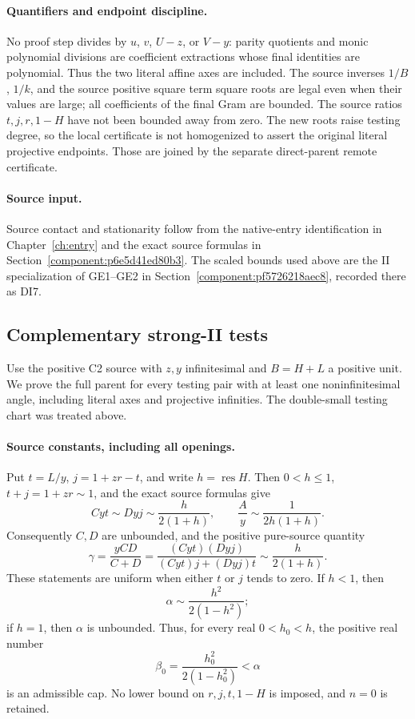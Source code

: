 \paragraph{Quantifiers and endpoint discipline.}
No proof step divides by $u$, $v$, $U-z$, or $V-y$: parity quotients
and monic polynomial divisions are coefficient extractions whose
final identities are polynomial.  Thus the two literal affine axes
are included.  The source inverses $1/B$, $1/k$, and the source
positive square term square roots are legal even when their values are large;
all coefficients of the final Gram are bounded.  The source ratios
$t,j,r,1-H$ have not been bounded away from zero.  The new roots
raise testing degree, so the local certificate is not homogenized
to assert the original literal projective endpoints.  Those are
joined by the separate direct-parent remote certificate.

\paragraph{Source input.}
Source contact and stationarity follow from the native-entry identification in Chapter~\ref{ch:entry} and the exact source formulas in Section~\ref{component:p6e5d41ed80b3}. The scaled bounds used above are the II specialization of GE1--GE2 in Section~\ref{component:pf5726218aec8}, recorded there as DI7.

\subsection{Complementary strong-II tests}
\label{component:p590112f102bd}

\label{p590112f102bd:sec:r7-c2-remote}

Use the positive C2 source with $z,y$ infinitesimal and $B=H+L$ a
positive unit. We prove the full parent for every testing pair with at
least one noninfinitesimal angle, including literal axes and projective
infinities. The double-small testing chart was treated above.

\paragraph{Source constants, including all openings.}
Put $t=L/y$, $j=1+zr-t$, and write $h=\operatorname{res}H$.
Then $0<h\leq1$, $t+j=1+zr\sim1$, and the exact source formulas give
\[
 Cyt\sim Dyj\sim\frac{h}{2(1+h)},\qquad
 \frac Ay\sim\frac1{2h(1+h)}.
\]
Consequently $C,D$ are unbounded, and the positive pure-source quantity
\[
 \gamma=\frac{yCD}{C+D}
 =\frac{(Cyt)(Dyj)}{(Cyt)j+(Dyj)t}
 \sim\frac{h}{2(1+h)}.                                      \tag{RR1}
\]
These statements are uniform when either $t$ or $j$ tends to zero.
If $h<1$, then
\[
 \alpha\sim\frac{h^2}{2(1-h^2)};
\]
if $h=1$, then $\alpha$ is unbounded.  Thus, for every real
$0<h_0<h$, the positive real number
\[
 \beta_0=\frac{h_0^2}{2(1-h_0^2)}<\alpha                     \tag{RR2}
\]
is an admissible cap.  No lower bound on $r,j,t,1-H$ is imposed,
and $n=0$ is retained.

